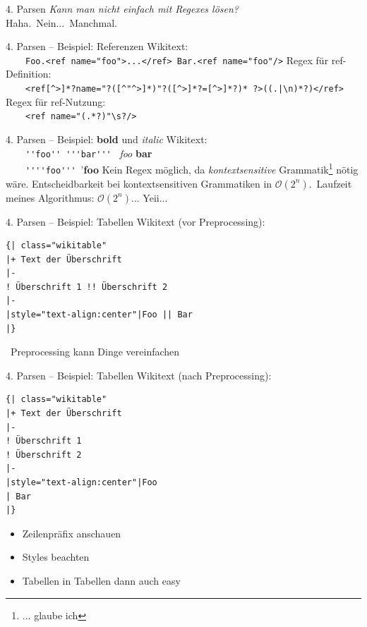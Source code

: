 \documentclass[9pt]{beamer}
\begin{document}
	\begin{frame}[fragile]{4. Parsen}
		\textit{Kann man nicht einfach mit Regexes lösen?}\\\pause
		Haha.\pause\ Nein.\pause..\ Manchmal.
	\end{frame}

	\begin{frame}[fragile]{4. Parsen -- Beispiel: Referenzen}
		Wikitext:\\
		~~~~\verb+Foo.<ref name="foo">...</ref> Bar.<ref name="foo"/>+\n\pause
		Regex für ref-Definition:\\
		~~~~\verb+<ref[^>]*?name="?([^"^>]*)"?([^>]*?=[^>]*?)* ?>((.|\n)*?)</ref>+\n
		Regex für ref-Nutzung:\\
		~~~~\verb+<ref name="(.*?)"\s?/>+
	\end{frame}

	\begin{frame}[fragile]{4. Parsen -- Beispiel: \textbf{bold} und \textit{italic}}
		Wikitext:\\
		~~~~\verb+''foo'' '''bar'''+ \textrightarrow\ \textit{foo} \textbf{bar}\\\pause
		~~~~\verb+''''foo+\pause\verb+'''+\pause \textrightarrow\ '\textbf{foo}\n\pause
		Kein Regex möglich, da \textit{kontextsensitive} Grammatik\footnote{... glaube ich} nötig wäre.\n
		Entscheidbarkeit bei kontextsensitiven Grammatiken in $\mathcal{O}(2^n)$.\pause\ Laufzeit meines Algorithmus: $\mathcal{O}(2^n)$.\pause.. Yeii...
	\end{frame}

	\begin{frame}[t,fragile]{4. Parsen -- Beispiel: Tabellen}
		Wikitext (vor Preprocessing):\\
		\begin{verbatim}
{| class="wikitable"
|+ Text der Überschrift
|-
! Überschrift 1 !! Überschrift 2
|-
|style="text-align:center"|Foo || Bar
|}

		\end{verbatim}
		\textrightarrow\ Preprocessing kann Dinge vereinfachen
	\end{frame}

	\begin{frame}[t,fragile]{4. Parsen -- Beispiel: Tabellen}
		Wikitext (nach Preprocessing):\\
		\begin{verbatim}
{| class="wikitable"
|+ Text der Überschrift
|-
! Überschrift 1
! Überschrift 2
|-
|style="text-align:center"|Foo
| Bar
|}
		\end{verbatim}
		\pause
		\begin{itemize}
			\item Zeilenpräfix anschauen
			\item Styles beachten
			\item Tabellen in Tabellen dann auch easy
		\end{itemize}
	\end{frame}
\end{document}
